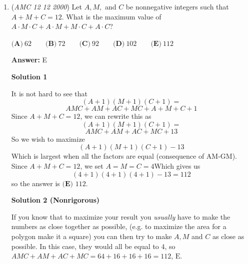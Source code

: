 \begin{enumerate}
 



\textbf{Solution 6}

Notice that $a=\frac{a}{b}-1$ and $b=1-\frac{b}{a}$. Then, $\frac{a}{b}=1+a$ and $\frac{b}{a}=1-b$.

 $\frac{a}{b}+\frac{b}{a}-ab=(1+a)+(1-b)-(a-b)=2$. The answer is $\boxed{E}$.

 



\textbf{Solution 7}

We are told $ab=a-b$.

 Dividing by $a$, we get $b = 1 - \frac{b}{a} \Rightarrow \boxed{ \frac{b}{a} = 1 - b}$.

 We can also solve for $\frac{a}{b}$ by dividing by $b$. Dividing, we get $a = \frac{a}{b} - 1 \Rightarrow \boxed{ \frac{a}{b} = a + 1}$. 

 Plugging these values into $\frac{a}{b} + \frac{b}{a} - ab$, we get:

 
 \[(a + 1) + (1 - b) - (a - b) = 2\]

 Therefore, the final answer is $\boxed{\text{E}}$

 -Dustin\_Links

 


 


	\item (\textit{AMC 12 12 2000}) Let $A, M,$ and $C$ be nonnegative integers such that $A + M + C=12$. What is the maximum value of $A \cdot M \cdot C + A \cdot M + M \cdot C + A \cdot C$?


 $\textbf{(A)}\ 62 \qquad \textbf{(B)}\ 72 \qquad \textbf{(C)}\ 92 \qquad \textbf{(D)}\ 102 \qquad \textbf{(E)}\ 112$

 \textbf{Answer: }E



\textbf{Solution 1}

It is not hard to see that 
 \[(A+1)(M+1)(C+1)=\]
 \[AMC+AM+AC+MC+A+M+C+1\]Since $A+M+C=12$, we can rewrite this as
 \[(A+1)(M+1)(C+1)=\]
 \[AMC+AM+AC+MC+13\]So we wish to maximize
 \[(A+1)(M+1)(C+1)-13\]Which is largest when all the factors are equal (consequence of AM-GM).  Since $A+M+C=12$, we set $A=M=C=4$Which gives us 
 \[(4+1)(4+1)(4+1)-13=112\]so the answer is $\boxed{\textbf{(E) }112}.$




\textbf{Solution 2 (Nonrigorous)}

If you know that to maximize your result you \textit{usually} have to make the numbers as close together as possible, (e.g. to maximize the area for a polygon make it a square) you can then try to make $A,M$ and $C$ as close as possible. In this case, they would all be equal to $4$, so $AMC+AM+AC+MC=64+16+16+16=112$, $\boxed{\text{E}}$.


\end{enumerate}
